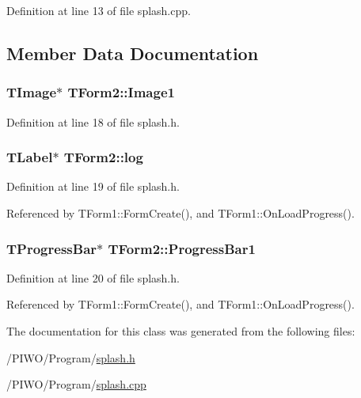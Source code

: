 Definition at line 13 of file splash.cpp.

\subsection{Member Data Documentation}
\hypertarget{classTForm2_f53196944e6698dc1318f506fa6f51fa}{
\subsubsection[Image1]{\setlength{\rightskip}{0pt plus 5cm}TImage$\ast$ {\bf TForm2::Image1}}}
\label{classTForm2_f53196944e6698dc1318f506fa6f51fa}




Definition at line 18 of file splash.h.\hypertarget{classTForm2_db78dd561a0e8a3cf278d85c61f70cd8}{
\subsubsection[log]{\setlength{\rightskip}{0pt plus 5cm}TLabel$\ast$ {\bf TForm2::log}}}
\label{classTForm2_db78dd561a0e8a3cf278d85c61f70cd8}




Definition at line 19 of file splash.h.

Referenced by TForm1::FormCreate(), and TForm1::OnLoadProgress().\hypertarget{classTForm2_931733bf3a3339d75e224dbe9ddc24fb}{
\subsubsection[ProgressBar1]{\setlength{\rightskip}{0pt plus 5cm}TProgressBar$\ast$ {\bf TForm2::ProgressBar1}}}
\label{classTForm2_931733bf3a3339d75e224dbe9ddc24fb}




Definition at line 20 of file splash.h.

Referenced by TForm1::FormCreate(), and TForm1::OnLoadProgress().

The documentation for this class was generated from the following files:\begin{CompactItemize}
\item 
/PIWO/Program/\hyperlink{splash_8h}{splash.h}\item 
/PIWO/Program/\hyperlink{splash_8cpp}{splash.cpp}\end{CompactItemize}
